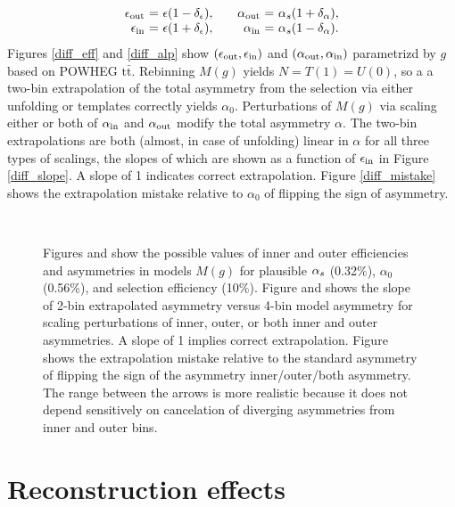 \documentclass[letterpaper,11pt]{article}
\newcommand{\selected}{{\ensuremath s}}
\newcommand{\tot}{0}
\begin{document}
\[
\begin{array}{r@{\ =\ }l@{,\qquad}r@{\ =\ }l}
  \epsilon_\outr & \epsilon(1 - \depsilon) & \alpha_\outr & \alpha_\selected(1 + \dalpha),\\
  \epsilon_\innr & \epsilon(1+ \depsilon)  & \alpha_\innr & \alpha_\selected(1 - \dalpha).
\end{array}
\]
Figures \ref{diff_eff} and \ref{diff_alp} show
$(\epsilon_{\mathrm{out}},\epsilon_{\mathrm{in}})$ and $(\alpha_{\mathrm{out}},\alpha_{\mathrm{in}})$
parametrizd by $g$ based on POWHEG $\mathrm{t\bar{t}}$. Rebinning
$M(g)$ yields $N=T(1)=U(0)$, so a a two-bin extrapolation of the total
asymmetry from the selection via either unfolding or templates
correctly yields $\alpha_\tot$.  Perturbations of $M(g)$ via scaling
either or both of $\alpha_{\mathrm{in}}$ and $\alpha_{\mathrm{out}}$ modify the total
asymmetry $\alpha$.  The two-bin extrapolations are both (almost, in
case of unfolding) linear in $\alpha$ for all three types of scalings,
the slopes of which are shown as a function of $\epsilon_{\mathrm{in}}$ in
Figure \ref{diff_slope}.  A slope of 1 indicates correct
extrapolation.  Figure \ref{diff_mistake} shows the extrapolation
mistake relative to $\alpha_\tot$ of flipping the sign of asymmetry.
\begin{figure}
  \centering
  \\
  \caption{\label{differential} Figures \protect{} and
    \protect{} show the possible values of inner and
    outer efficiencies and asymmetries in models $M(g)$ for plausible
    $\alpha_\selected$ (0.32\%), $\alpha_\tot$ (0.56\%), and selection
    efficiency (10\%).  Figure \protect{} and shows
    the slope of 2-bin extrapolated asymmetry versus 4-bin model
    asymmetry for scaling perturbations of inner, outer, or both inner
    and outer asymmetries.  A slope of 1 implies correct
    extrapolation.  Figure \protect{} shows the
    extrapolation mistake relative to the standard asymmetry of
    flipping the sign of the asymmetry inner/outer/both asymmetry.
    The range between the arrows is more realistic because it does not
    depend sensitively on cancelation of diverging asymmetries from
    inner and outer bins.}
\end{figure}


\section{Reconstruction effects}
\end{document}
